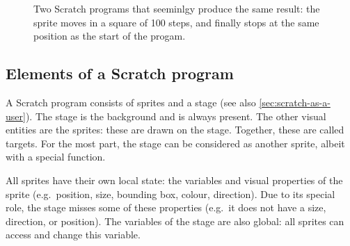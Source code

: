 \documentclass[../main]{subfiles}
\begin{document}
\begin{figure}
    \centering
    \begin{subfigure}{0.45\textwidth}
        \centering
        \begin{scratch}[scale=0.7]
        \end{scratch}
    \end{subfigure}
    \begin{subfigure}{0.45\textwidth}
        \centering
        \begin{scratch}[scale=0.7]
        \end{scratch}
    \end{subfigure}
    \caption{Two Scratch programs that seeminlgy produce the same result: the sprite moves in a square of 100 steps, and finally stops at the same position as the start of the progam.}\label{fig:scratch-two-programs}
\end{figure}

\subsection{Elements of a Scratch program}\label{subsec:elements-of-a-scratch-program}

A Scratch program consists of sprites and a stage (see also \cref{sec:scratch-as-a-user}).
The stage is the background and is always present.
The other visual entities are the sprites: these are drawn on the stage.
Together, these are called targets.
For the most part, the stage can be considered as another sprite, albeit with a special function.

All sprites have their own local state: the variables and visual properties of the sprite (e.g.\ position, size, bounding box, colour, direction).
Due to its special role, the stage misses some of these properties (e.g.\ it does not have a size, direction, or position).
The variables of the stage are also global: all sprites can access and change this variable.
\end{document}
